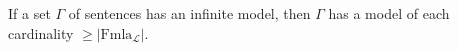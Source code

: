 If a set $\Gamma$ of sentences has an infinite model, then $\Gamma$ has a model of each cardinality $\geq |\mathrm{Fmla}_{\mathcal{L}}|$.
